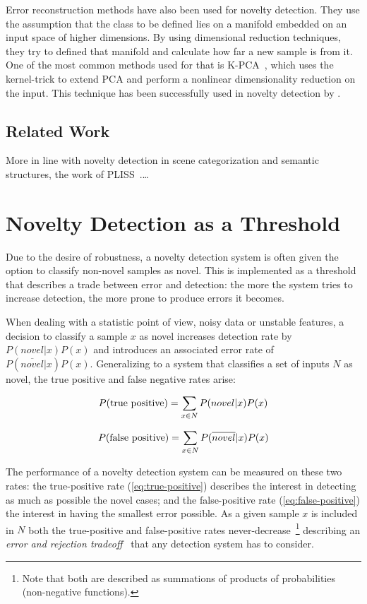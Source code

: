 Error reconstruction methods have also been used for novelty detection.
They use the assumption that the class to be defined lies on a manifold embedded
on an input space of higher dimensions. By using dimensional reduction
techniques, they try to defined that manifold and calculate how far a new sample
is from it.
One of the most common methods used for that is
\gls{K-PCA}~\cite{scholkopf1997kernel}, which uses the kernel-trick to extend
\gls{PCA} and perform a nonlinear dimensionality reduction on the input.
This technique has been successfully used in novelty detection by
\cite{Hoffmann2007863}.

\subsection{Related Work}
More in line with novelty detection in scene categorization and semantic
structures, the work of \gls{PLISS}~\cite{ranganathan2010pliss}.\dots 



\section{Novelty Detection as a Threshold}
Due to the desire of robustness, a novelty detection system is often given the option
to classify non-novel samples as novel. This is implemented as a threshold that describes a trade
between error and detection: the more the system tries to increase detection, the more
prone to produce errors it becomes.

When dealing with a statistic point of view, noisy data or unstable features,
a decision to classify a sample $x$ as novel increases detection rate by
$P(novel|x)P(x)$ and introduces an associated error rate of $P(\overline{novel}|x)P(x)$.
Generalizing to a system that classifies a set of inputs $N$ as novel, the
true positive and false negative rates arise:

\begin{equation}
\label{eq:true-positive}
P(\textnormal{true positive}) = \sum_{x \in N}{P(novel|x)P(x)}
\end{equation}

\begin{equation}
\label{eq:false-positive}
P(\textnormal{false positive}) = \sum_{x \in N}{P(\overline{novel}|x)P(x)}
\end{equation}

The performance of a novelty detection system can be measured on these two
rates: the true-positive rate (\autoref{eq:true-positive}) describes the
interest in detecting as much as possible the novel cases;
and the false-positive rate (\autoref{eq:false-positive}) the interest in
having the smallest error possible.
As a given sample $x$ is included in $N$ both the true-positive and
false-positive rates never-decrease~\footnote{Note that both are described as
summations of products of probabilities (non-negative functions).} describing an
\emph{error and rejection tradeoff}~\cite{chow1970optimum} that any detection
system has to consider.

